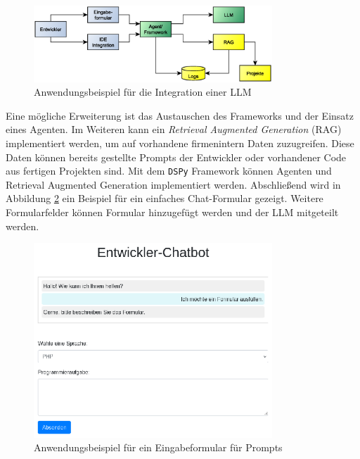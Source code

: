 \begin{figure}[!ht]
	\includegraphics[width=0.8\textwidth]{content/chapter_discussion/images/anwendungsbeispiel.eps}
	\centering
	\caption{Anwendungsbeispiel für die Integration einer LLM}
	\label{img:example_firm_integration}
\end{figure}

Eine mögliche Erweiterung ist das Austauschen des Frameworks und der Einsatz eines Agenten. Im Weiteren kann ein \textit{Retrieval Augmented Generation} (RAG) implementiert werden, um auf vorhandene firmenintern Daten zuzugreifen. Diese Daten können bereits gestellte Prompts der Entwickler oder vorhandener Code aus fertigen Projekten sind. Mit dem \texttt{DSPy} Framework können Agenten und Retrieval Augmented Generation implementiert werden. Abschließend wird in Abbildung \ref{img:example_chat_form} ein Beispiel für ein einfaches Chat-Formular gezeigt. Weitere Formularfelder können Formular hinzugefügt werden und der LLM mitgeteilt werden.\vspace{0.2cm}

\begin{figure}[!ht]
	\includegraphics[width=0.8\textwidth]{content/chapter_discussion/images/chatbot_form_example.eps}
	\centering
	\caption{Anwendungsbeispiel für ein Eingabeformular für Prompts}
	\label{img:example_chat_form}
\end{figure}

